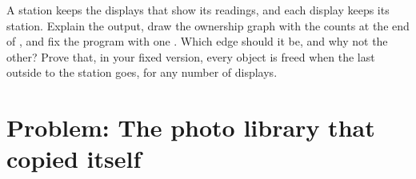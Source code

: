 \begin{exercise}[$\star\star\star$]\label{exo:b2:cpp-copy-move:12}
A station keeps the displays that show its readings, and each display keeps its station. Explain the output, draw
the ownership graph with the counts at the end of , and fix the program with one .
Which edge should it be, and why not the other? Prove that, in your fixed version, every object is freed when the
last outside  to the station goes, for any number of displays.
\end{exercise}

\section{Problem: The photo library that copied itself}\label{sec:b2:cpp-copy-move:problem}

